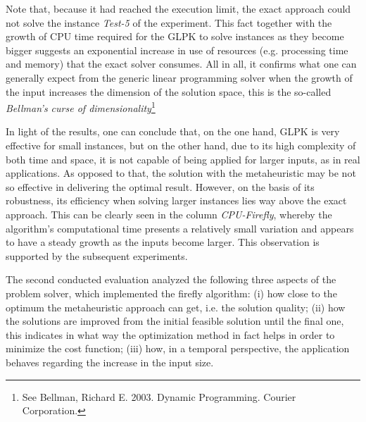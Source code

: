 \documentclass[tuberlin,cic,tc,openright,english,noabntcite,oneside]{iiufrgs}
\begin{document}
Note that, because it had reached the execution limit, the exact approach could not solve the instance \emph{Test-5} of the experiment. This fact together with the growth of CPU time required for the GLPK to solve instances as they become bigger suggests an exponential increase in use of resources (e.g. processing time and memory) that the exact solver consumes. All in all, it confirms what one can generally expect from the generic linear programming solver when the growth of the input increases the dimension of the solution space, this is the so-called \emph{Bellman's curse of dimensionality}\footnote{See Bellman, Richard E. 2003. Dynamic Programming.  Courier Corporation.}

In light of the results, one can conclude that, on the one hand, GLPK is very effective for small instances, but on the other hand, due to its high complexity of both time and space, it is not capable of being applied for larger inputs, as in real applications. As opposed to that, the solution with the metaheuristic may be not so effective in delivering the optimal result. However, on the basis of its robustness, its efficiency when solving larger instances lies way above the exact approach. This can be clearly seen in the column \emph{CPU-Firefly}, whereby the algorithm's computational time presents a relatively small variation and appears to have a steady growth as the inputs become larger. This observation is supported by the subsequent experiments.

The second conducted evaluation analyzed the following three aspects of the problem solver, which implemented the firefly algorithm: (i) how close to the optimum the metaheuristic approach can get, i.e. the solution quality; (ii) how the solutions are improved from the initial feasible solution until the final one, this indicates in what way the optimization method in fact helps in order to minimize the cost function; (iii) how, in a temporal perspective, the application behaves regarding the increase in the input size.
\end{document}
